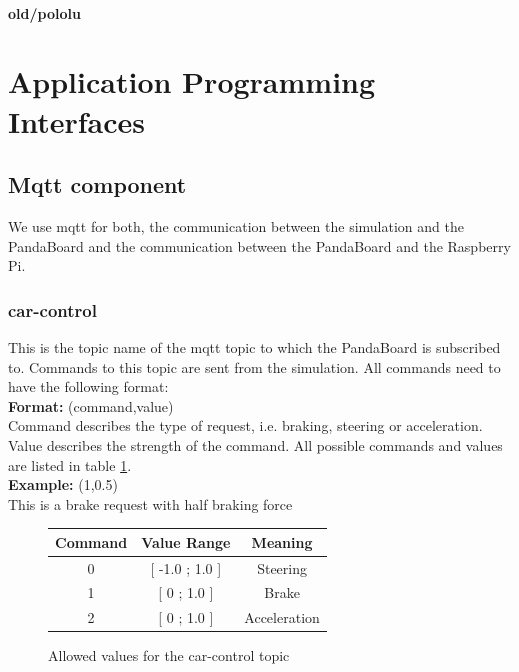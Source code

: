 \paragraph{old/pololu}


\section{Application Programming Interfaces}

\subsection{Mqtt component}
We use mqtt for both, the communication between the simulation and the PandaBoard and the communication between the PandaBoard and the Raspberry Pi.

\subsubsection{car-control}
This is the topic name of the mqtt topic to which the PandaBoard is subscribed to. Commands to this topic are sent from the simulation. All commands need to have the following format: \\

\textbf{Format:} (command,value) \\
Command describes the type of request, i.e. braking, steering or acceleration. Value describes the strength of the command. All possible commands and values are listed in table \ref{tab:car-control}. \\

\textbf{Example:} (1,0.5) \\
This is a brake request with half braking force \\

\begin{figure}[h]
    \centering
    \begin{tabular}{c | c | c}
        \textbf{Command} & \textbf{Value Range} & \textbf{Meaning} \\ \hline
        0   &   [ -1.0 ; 1.0 ]    & Steering \\
        1   &   [ 0 ; 1.0 ]       & Brake \\ 
        2   &   [ 0 ; 1.0 ]       & Acceleration \\ 
    \end{tabular}
    \caption{Allowed values for the car-control topic}
    \label{tab:car-control}
\end{figure}


